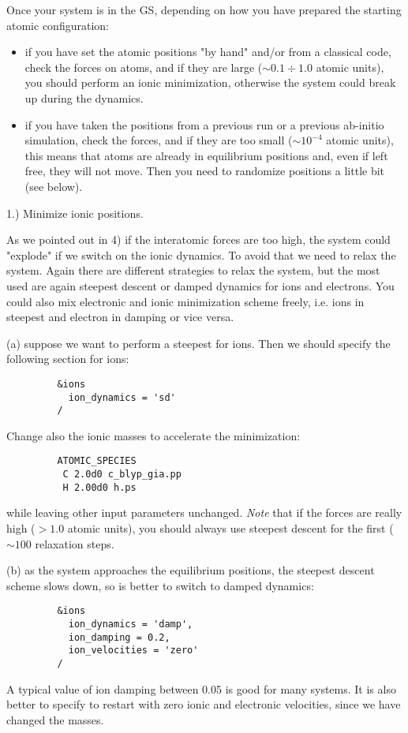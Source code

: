 \documentclass[12pt,a4paper]{article}
\begin{document}
Once your system is in the GS, depending on how you have prepared the starting
atomic configuration:
\begin{itemize}
\item
if you have set the atomic positions "by hand" and/or from a classical code, 
check the forces on atoms, and if they are large ($\sim 0.1 \div 1.0$
atomic units), you should perform an ionic minimization, otherwise the
system could break up during the dynamics.
\item
if you have taken the positions from a previous run or a previous ab-initio 
simulation, check the forces, and if they are too small ($\sim 10^{-4}$ 
atomic units), this means that atoms are already in equilibrium positions 
and, even if left free, they will not move. Then you need to randomize 
positions a little bit (see below).
\end{itemize}

1.) Minimize ionic positions.

As we pointed out in 4) if the interatomic forces are too high, 
the system could "explode" if we switch on the ionic dynamics. 
To avoid that we need to relax the system. Again there are 
different strategies to relax the system, but the most used 
are again steepest descent or damped dynamics for ions and electrons. 
You could also mix electronic and ionic minimization scheme freely, 
i.e. ions in steepest and electron in damping or vice versa.
    
(a) suppose we want to perform a steepest for ions. Then we should specify 
the following section for ions:
\begin{verbatim} 
         &ions
           ion_dynamics = 'sd'
         /
\end{verbatim} 
Change also the ionic masses to accelerate the minimization:
\begin{verbatim} 
         ATOMIC_SPECIES
          C 2.0d0 c_blyp_gia.pp
          H 2.00d0 h.ps
\end{verbatim} 
while leaving other input parameters unchanged.
{\em Note} that if the forces are really high ($> 1.0$ atomic units), you
should always use steepest descent for the first ($\sim 100$
relaxation steps. 

(b) as the system approaches the equilibrium positions, the steepest 
descent scheme slows down, so is better to switch to damped dynamics:
\begin{verbatim} 
         &ions
           ion_dynamics = 'damp',
           ion_damping = 0.2,
           ion_velocities = 'zero'
         /
\end{verbatim}
A typical value of ion damping between 0.05 is good for many systems. 
It is also better to specify to restart with zero ionic and electronic 
velocities, since we have changed the masses.
    
\end{document}
